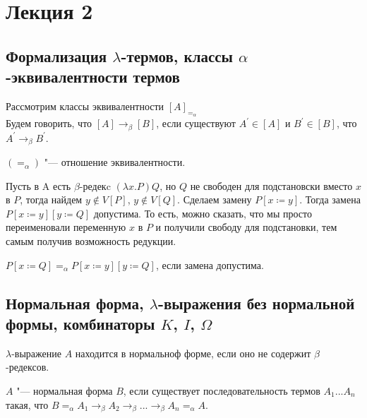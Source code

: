 \section{Лекция 2}

\subsection{Формализация $\lambda$-термов, классы $\alpha$-эквивалентности термов}

\begin{definition}
	Рассмотрим классы эквивалентности $[A]_{=_{\alpha}}$ \\
	Будем говорить, что $[A]\to_{\beta}[B]$, если  существуют $A^{'}\in [A]$ и $B^{'} \in [B]$, что $A^{'}\to_{\beta}B^{'}$.
\end{definition}

\begin{lemma}
	$(=_{\alpha})$ "--- отношение эквивалентности.
\end{lemma}

Пусть в A есть $\beta$-редекc $(\lambda{}x.P)Q$, но $Q$ не свободен для подстановски вместо $x$ в $P$,
тогда найдем $y\notin V[P]$, $y\notin V[Q]$. Сделаем замену $P[x\coloneqq{}y]$.
Тогда замена $P[x\coloneqq{}y][y\coloneqq{}Q]$ допустима. То есть, можно сказать, что мы просто переименовали переменную $x$ в $P$ и получили свободу для подстановки, тем самым получив возможность редукции.

\begin{lemma}
	$P[x\coloneqq{}Q]=_{\alpha}P[x\coloneqq{}y][y\coloneqq{}Q]$, если замена допустима.
\end{lemma}

\subsection{Нормальная форма, $\lambda$-выражения без нормальной формы, комбинаторы $K$, $I$, $\Omega$}

\begin{definition}
	$\lambda$-выражение $A$ находится в нормальноф форме, если оно не содержит $\beta$-редексов.
\end{definition}

\begin{definition}
	$A$ "--- нормальная форма $B$, если существует последовательность термов $A_{1}...A_{n}$ такая, что $B=_{\alpha}A_{1}\to_{\beta}A_{2}\to_{\beta}...\to_{\beta}A_{n}=_{\alpha}A$.
\end{definition}

